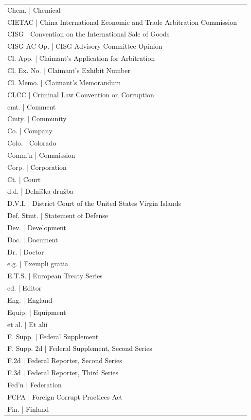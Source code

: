 \begin{longtable}[l]{p{1.3in}p{5.1in}}
Chem.       | Chemical \\
CIETAC      | China International Economic and Trade Arbitration Commission \\
CISG        | Convention on the International Sale of Goods \\
CISG-AC Op. | CISG Advisory Committee Opinion \\
Cl. App.    | Claimant's Application for Arbitration \\
Cl. Ex. No. | Claimant's Exhibit Number \\
Cl. Memo.   | Claimant's Memorandum \\ 
CLCC        | Criminal Law Convention on Corruption \\
cmt.        | Comment \\
Cmty.       | Community \\
Co.         | Company \\
Colo.       | Colorado \\
Comm'n      | Commission \\
Corp.       | Corporation \\
Ct.         | Court \\
d.d.        | Delni\v{s}ka dru\v{z}ba\\  
D.V.I.      | District Court of the United States Virgin Islands \\
Def. Stmt.  | Statement of Defense \\
Dev.        | Development \\
Doc.        | Document \\
Dr.         | Doctor \\
e.g.        | Exempli gratia\\
E.T.S.      | European Treaty Series\\
ed.         | Editor \\
Eng.        | England \\
Equip.      | Equipment \\
et al.      | Et alii \\
F. Supp.    | Federal Supplement \\
F. Supp. 2d | Federal Supplement, Second Series \\
F.2d        | Federal Reporter, Second Series  \\
F.3d        | Federal Reporter, Third Series \\
Fed'n       | Federation \\
FCPA        | Foreign Corrupt Practices Act \\
Fin.        | Finland \\

\end{longtable}
